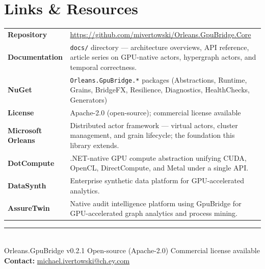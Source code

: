 \documentclass[11pt,a4paper]{article}
\begin{document}
\section{Links \& Resources}

\begin{tcolorbox}[keybox={Repository \textnormal{and} Ecosystem}]
\renewcommand{\arraystretch}{1.4}
\begin{tabularx}{\textwidth}{>{\bfseries\color{brand}}l X}
  Repository &
    \url{https://github.com/mivertowski/Orleans.GpuBridge.Core} \\
  Documentation &
    \texttt{docs/} directory --- architecture overviews, API reference,
    article series on GPU-native actors, hypergraph actors, and temporal
    correctness. \\
  NuGet &
    \texttt{Orleans.GpuBridge.*} packages (Abstractions, Runtime, Grains,
    BridgeFX, Resilience, Diagnostics, HealthChecks, Generators) \\
  License &
    Apache-2.0 (open-source); commercial license available \\
\midrule
  Microsoft Orleans &
    Distributed actor framework --- virtual actors, cluster management,
    and grain lifecycle; the foundation this library extends. \\
  DotCompute &
    .NET-native GPU compute abstraction unifying CUDA, OpenCL,
    DirectCompute, and Metal under a single API. \\
  DataSynth &
    Enterprise synthetic data platform for GPU-accelerated analytics. \\
  AssureTwin &
    Native audit intelligence platform using GpuBridge for
    GPU-accelerated graph analytics and process mining. \\
\end{tabularx}
\end{tcolorbox}

\vfill
\begin{center}
\textcolor{midgray}{\rule{0.5\textwidth}{0.4pt}}\\[0.8em]
{\small\textcolor{midgray}{%
  Orleans.GpuBridge v0.2.1 \textbullet{}
  Open-source (Apache-2.0) \textbullet{}
  Commercial license available%
}}\\[4pt]
{\small\textcolor{midgray}{%
  \textbf{Contact:} \href{mailto:michael.ivertowski@ch.ey.com}{michael.ivertowski@ch.ey.com}%
}}
\end{center}
\end{document}
